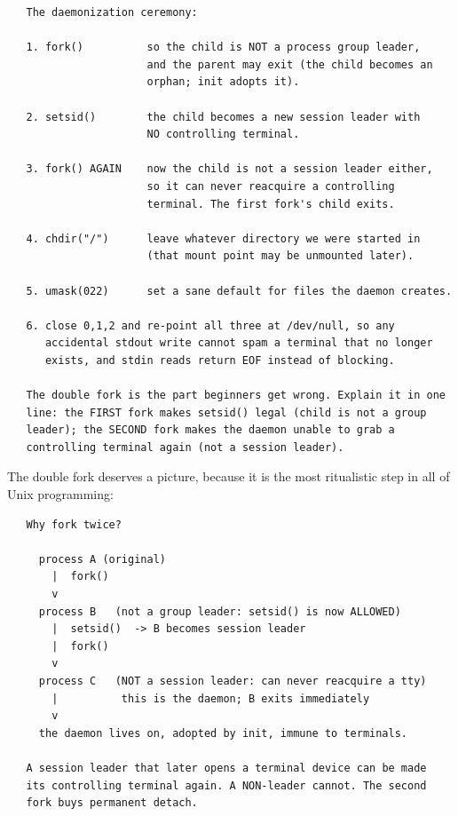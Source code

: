 \begin{verbatim}
   The daemonization ceremony:

   1. fork()          so the child is NOT a process group leader,
                      and the parent may exit (the child becomes an
                      orphan; init adopts it).

   2. setsid()        the child becomes a new session leader with
                      NO controlling terminal.

   3. fork() AGAIN    now the child is not a session leader either,
                      so it can never reacquire a controlling
                      terminal. The first fork's child exits.

   4. chdir("/")      leave whatever directory we were started in
                      (that mount point may be unmounted later).

   5. umask(022)      set a sane default for files the daemon creates.

   6. close 0,1,2 and re-point all three at /dev/null, so any
      accidental stdout write cannot spam a terminal that no longer
      exists, and stdin reads return EOF instead of blocking.

   The double fork is the part beginners get wrong. Explain it in one
   line: the FIRST fork makes setsid() legal (child is not a group
   leader); the SECOND fork makes the daemon unable to grab a
   controlling terminal again (not a session leader).
\end{verbatim}

The double fork deserves a picture, because it is the most ritualistic
step in all of Unix programming:

\begin{verbatim}
   Why fork twice?

     process A (original)
       |  fork()
       v
     process B   (not a group leader: setsid() is now ALLOWED)
       |  setsid()  -> B becomes session leader
       |  fork()
       v
     process C   (NOT a session leader: can never reacquire a tty)
       |          this is the daemon; B exits immediately
       v
     the daemon lives on, adopted by init, immune to terminals.

   A session leader that later opens a terminal device can be made
   its controlling terminal again. A NON-leader cannot. The second
   fork buys permanent detach.
\end{verbatim}

